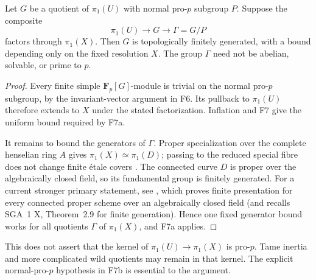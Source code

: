 \begin{corollary}
Let $G$ be a quotient of $\pi_1(U)$ with normal pro-$p$ subgroup
$P$. Suppose the composite
\[
 \pi_1(U)\longrightarrow G\longrightarrow\Gamma=G/P
\]
factors through $\pi_1(X)$. Then $G$ is topologically finitely
generated, with a bound depending only on the fixed resolution $X$.
The group $\Gamma$ need not be abelian, solvable, or prime to $p$.
\end{corollary}
\begin{proof}
Every finite simple $\mathbf F_p[G]$-module is trivial on the normal
pro-$p$ subgroup, by the invariant-vector argument in F6. Its
pullback to $\pi_1(U)$ therefore extends to $X$ under the stated
factorization. Inflation and F7 give the uniform bound required
by F7a.

It remains to bound the generators of $\Gamma$. Proper
specialization over the complete henselian ring $A$ gives
$\pi_1(X)\simeq\pi_1(D)$; passing to the reduced special fibre does
not change finite \'etale covers
\cite[Lemma 58.9.1, tag 0A48]{StacksProperEtaleSpecialization}.
The connected curve $D$ is proper over the algebraically closed
field, so its fundamental group is finitely generated. For a
current stronger primary statement, see
\cite[Theorem 1.2, p.~1]{LaraSrinivasStix2024}, which proves finite
presentation for every connected proper scheme over an
algebraically closed field (and recalls SGA~1 X, Theorem~2.9 for
finite generation). Hence one fixed generator bound works for
all quotients $\Gamma$ of $\pi_1(X)$, and F7a applies.
\end{proof}

This does not assert that the kernel of $\pi_1(U)\to\pi_1(X)$ is
pro-$p$. Tame inertia and more complicated wild quotients may
remain in that kernel. The explicit normal-pro-$p$ hypothesis in
F7b is essential to the argument.
